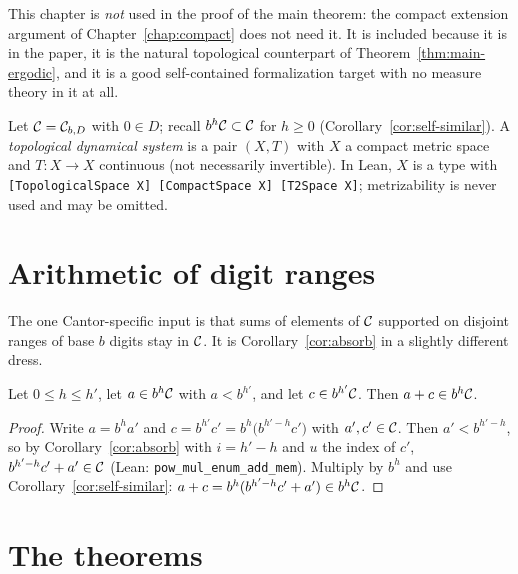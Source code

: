 \label{chap:vdw}

This chapter is \emph{not} used in the proof of the main theorem: the compact extension argument
of Chapter~\ref{chap:compact} does not need it.  It is included because it is in the paper, it is
the natural topological counterpart of Theorem~\ref{thm:main-ergodic}, and it is a good
self-contained formalization target with no measure theory in it at all.

Let $\mathcal{C} = \mathcal{C}_{b,D}$ with $0 \in D$; recall $b^h \mathcal{C} \subset \mathcal{C}$ for $h \geq 0$
(Corollary~\ref{cor:self-similar}).  A \emph{topological dynamical system} is a pair $(X,T)$ with
$X$ a compact metric space and $T : X \to X$ continuous (not necessarily invertible).  In Lean,
$X$ is a type with \texttt{[TopologicalSpace X] [CompactSpace X] [T2Space X]}; metrizability is
never used and may be omitted.

\section{Arithmetic of digit ranges}

The one Cantor-specific input is that sums of elements of $\mathcal{C}$ supported on disjoint
ranges of base $b$ digits stay in $\mathcal{C}$.  It is Corollary~\ref{cor:absorb} in a
slightly different dress.

\begin{lemma}
  \label{lem:digit-ranges}
  \leanok
  Let $0 \leq h \leq h'$, let $a \in b^h\mathcal{C}$ with $a < b^{h'}$, and let $c \in b^{h'}\mathcal{C}$.
  Then $a + c \in b^h\mathcal{C}$.
\end{lemma}

\begin{proof}
  Write $a = b^ha'$ and $c = b^{h'}c' = b^h\bigl(b^{h'-h}c'\bigr)$ with $a', c' \in \mathcal{C}$.
  Then $a' < b^{h'-h}$, so by Corollary~\ref{cor:absorb} with $i = h' - h$ and $u$ the index
  of $c'$, $b^{h'-h}c' + a' \in \mathcal{C}$ (Lean: \texttt{pow\_mul\_enum\_add\_mem}).  Multiply by
  $b^h$ and use Corollary~\ref{cor:self-similar}: $a + c = b^h(b^{h'-h}c' + a') \in b^h\mathcal{C}$.
\end{proof}

\section{The theorems}

